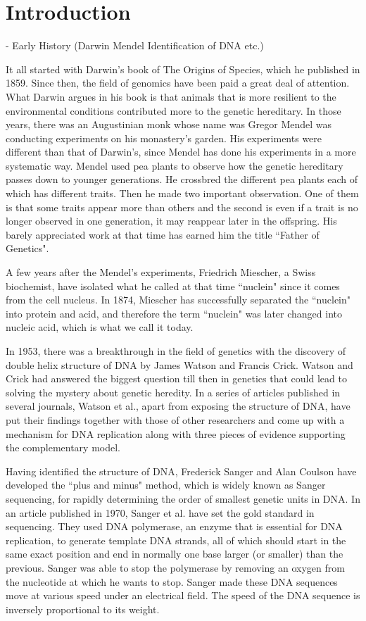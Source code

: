 \chapter{Introduction}
- Early History (Darwin Mendel Identification of DNA etc.)

It all started with Darwin's book of The Origins of Species, which he published in 1859. Since then, the field of genomics have been paid a great deal of attention. What Darwin argues in his book is that animals that is more resilient to the environmental conditions contributed more to the genetic hereditary. In those years, there was an Augustinian monk whose name was Gregor Mendel was conducting experiments on his monastery's garden. His experiments were different than that of Darwin's, since Mendel has done his experiments in a more systematic way. Mendel used pea plants to observe how the genetic hereditary passes down to younger generations. He crossbred the different pea plants each of which has different traits. Then he made two important observation. One of them is that some traits appear more than others and the second is even if a trait is no longer observed in one generation, it may reappear later in the offspring. His barely appreciated work at that time has earned him the title ``Father of Genetics".

A few years after the Mendel's experiments, Friedrich Miescher, a Swiss biochemist, have isolated what he called at that time ``nuclein" since it comes from the cell nucleus. In 1874, Miescher has successfully separated the ``nuclein" into protein and acid, and therefore the term ``nuclein" was later changed into nucleic acid, which is what we call it today\cite{pray2008discovery}.

In 1953, there was a breakthrough in the field of genetics with the discovery of double helix structure of DNA by James Watson and Francis Crick. Watson and Crick had answered the biggest question till then in genetics that could lead to solving the mystery about genetic heredity. In a series of articles published in several journals, Watson et al., apart from exposing the structure of DNA, have put their findings together with those of other researchers and come up with a mechanism for DNA replication along with three pieces of evidence supporting the complementary model\cite{watson1953structure}.

Having identified the structure of DNA, Frederick Sanger and Alan Coulson have developed the ``plus and minus" method, which is widely known as Sanger sequencing, for rapidly determining the order of smallest genetic units in DNA\cite{sanger1975rapid}. In an article published in 1970, Sanger et al. have set the gold standard in sequencing. They used DNA polymerase, an enzyme that is essential for DNA replication, to generate template DNA strands, all of which should start in the same exact position and end in normally one base larger (or smaller) than the previous. Sanger was able to stop the polymerase by removing an oxygen from the nucleotide at which he wants to stop. Sanger made these DNA sequences move at various speed under an electrical field. The speed of the DNA sequence is inversely proportional to its weight.

